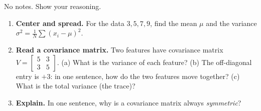 \documentclass[10pt]{article}
\begin{document}
\namedateperiod

\vspace{0.15in}

No notes. Show your reasoning.

\begin{enumerate}[leftmargin=1.8em, itemsep=16pt]
  \item \textbf{Center and spread.} For the data $3,5,7,9$, find the mean $\mu$ and the variance
        $\sigma^2=\frac1N\sum(x_i-\mu)^2$.
        \vspace{1.7cm}
  \item \textbf{Read a covariance matrix.} Two features have covariance matrix
        $V=\left[\begin{smallmatrix}5&3\\3&5\end{smallmatrix}\right]$.
        (a) What is the variance of each feature? \; (b) The off-diagonal entry is $+3$: in one sentence, how do
        the two features move together? \; (c) What is the total variance (the trace)?
        \vspace{1.6cm}
  \item \textbf{Explain.} In one sentence, why is a covariance matrix always \emph{symmetric}?
\end{enumerate}
\end{document}
